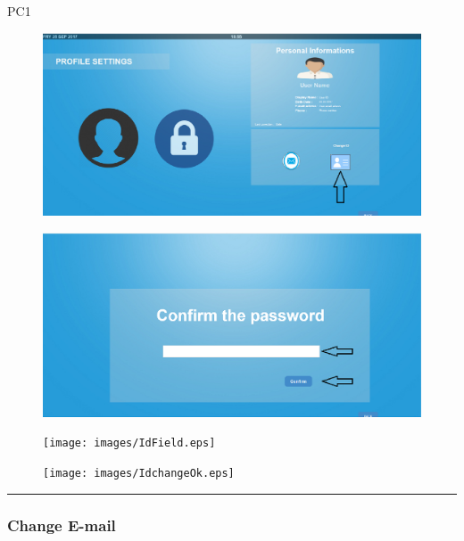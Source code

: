 \begin{lyxlist}{PC1}
\begin{figure}[H]
\centering
\includegraphics[width=170mm]{images/ChangeID1.eps}
\caption{\label{overflow}}
\end{figure}

\begin{figure}[H]
\centering
\includegraphics[width=170mm]{images/ComfirmField.eps}
\caption{\label{overflow}}
\end{figure}

\begin{figure}[H]
\centering
\texttt{[image: images/IdField.eps]}
\caption{\label{overflow}}
\end{figure}

\begin{figure}[H]
\centering
\texttt{[image: images/IdchangeOk.eps]}
\caption{\label{overflow}}
\end{figure}
\end{lyxlist}
\hrule


\subsubsection{Change E-mail}

